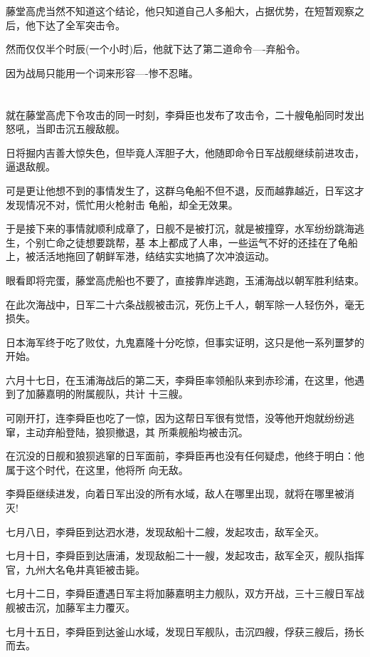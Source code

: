 \documentclass[11pt,a4paper,onecolumn]{article}
\begin{document}
藤堂高虎当然不知道这个结论，他只知道自己人多船大，占据优势，在短暂观察之后，他下达了全军突击令。

然而仅仅半个时辰(一个小时)后，他就下达了第二道命令----弃船令。

因为战局只能用一个词来形容----惨不忍睹。

\section[\thesection]{}

就在藤堂高虎下令攻击的同一时刻，李舜臣也发布了攻击令，二十艘龟船同时发出怒吼，当即击沉五艘敌舰。

日将掘内吉善大惊失色，但毕竟人浑胆子大，他随即命令日军战舰继续前进攻击，逼退敌舰。

可是更让他想不到的事情发生了，这群乌龟船不但不退，反而越靠越近，日军这才发现情况不对，慌忙用火枪射击
龟船，却全无效果。

于是接下来的事情就顺利成章了，日舰不是被打沉，就是被撞穿，水军纷纷跳海逃生，个别亡命之徒想要跳帮，基
本上都成了人串，一些运气不好的还挂在了龟船上，被活活地拖回了朝鲜军港，结结实实地搞了次冲浪运动。

眼看即将完蛋，藤堂高虎船也不要了，直接靠岸逃跑，玉浦海战以朝军胜利结束。

在此次海战中，日军二十六条战舰被击沉，死伤上千人，朝军除一人轻伤外，毫无损失。

日本海军终于吃了败仗，九鬼嘉隆十分吃惊，但事实证明，这只是他一系列噩梦的开始。

六月十七日，在玉浦海战后的第二天，李舜臣率领船队来到赤珍浦，在这里，他遇到了加藤嘉明的附属舰队，共计
十三艘。

可刚开打，连李舜臣也吃了一惊，因为这帮日军很有觉悟，没等他开炮就纷纷逃窜，主动弃船登陆，狼狈撤退，其
所乘舰船均被击沉。

在沉没的日舰和狼狈逃窜的日军面前，李舜臣再也没有任何疑虑，他终于明白：他属于这个时代，在这里，他将所
向无敌。

李舜臣继续进发，向着日军出没的所有水域，敌人在哪里出现，就将在哪里被消灭!

七月八日，李舜臣到达泗水港，发现敌船十二艘，发起攻击，敌军全灭。

七月十日，李舜臣到达唐浦，发现敌船二十一艘，发起攻击，敌军全灭，舰队指挥官，九州大名龟井真钜被击毙。

七月十二日，李舜臣遭遇日军主将加藤嘉明主力舰队，双方开战，三十三艘日军战舰被击沉，加藤军主力覆灭。

七月十五日，李舜臣到达釜山水域，发现日军舰队，击沉四艘，俘获三艘后，扬长而去。
\end{document}
